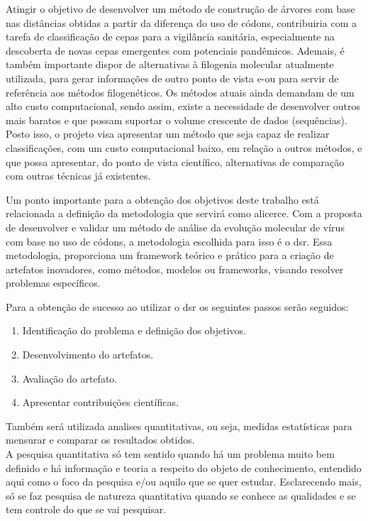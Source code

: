 Atingir o objetivo de desenvolver um método de construção de árvores com base nas distâncias obtidas a partir da diferença do uso de códons, contribuiria com a tarefa de classificação de cepas para a vigilância sanitária, especialmente na descoberta de novas cepas emergentes com potenciais pandêmicos. Ademais, é também importante dispor de alternativas à filogenia molecular atualmente utilizada, para gerar informações de outro ponto de vista e-ou para servir de referência aos métodos filogenéticos.
Os métodos atuais ainda demandam de um alto custo computacional, sendo assim, existe a necessidade de desenvolver outros mais baratos e que possam suportar o volume crescente de dados (sequências).
Posto isso, o projeto visa apresentar um método que seja capaz de realizar classificações, com um custo computacional baixo, em relação a outros métodos, e que possa apresentar, do ponto de vista científico, alternativas de comparação com outras técnicas já existentes.

Um ponto importante para a obtenção dos objetivos deste trabalho está relacionada a definição da metodologia que servirá como alicerce. Com a proposta de desenvolver e validar um método de análise da evolução molecular de vírus com base no uso de códons, a metodologia escolhida para isso é o \gls{dsr}. Essa metodologia, proporciona um framework teórico e prático para a criação de artefatos inovadores, como métodos, modelos ou frameworks, visando resolver problemas específicos.\cite{peffers_dsr_2007}

Para a obtenção de sucesso ao utilizar o \gls{dsr} os seguintes passos serão seguidos:
\begin{enumerate}
  \item Identificação do problema e definição dos objetivos.
  \item Desenvolvimento do artefatos.
  \item Avaliação do artefato.
  \item Apresentar contribuições científicas.
\end{enumerate}

Também será utilizada analises quantitativas, ou seja, medidas estatísticas para mensurar e comparar os resultados obtidos.\\
A pesquisa quantitativa só tem sentido quando há um problema muito bem definido e há informação e teoria a respeito do objeto de conhecimento, entendido aqui como o foco da pesquisa e/ou aquilo que se quer estudar. Esclarecendo mais, só se faz pesquisa de natureza quantitativa quando se conhece as qualidades e se tem controle do que se vai pesquisar.\cite{da_silva_pesquisa_2014}

